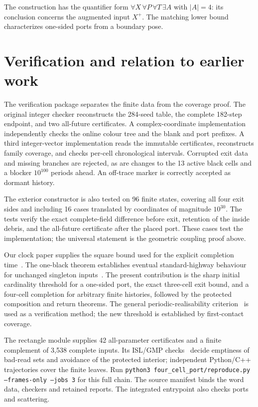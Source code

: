\documentclass[11pt]{article}
\begin{document}
The construction has the quantifier form
$\forall X\,\forall P\,\forall T\,\exists A$ with $|A|=4$: its conclusion
concerns the augmented input $X^+$. The matching lower bound characterizes
one-sided ports from a boundary pose.






\section{Verification and relation to earlier work}
The verification package separates the finite data from the coverage proof.
The original integer checker reconstructs the 284-seed table, the complete
182-step endpoint, and two all-future certificates. A complex-coordinate
implementation independently checks the online colour tree and the blank
and port prefixes. A third integer-vector implementation reads the immutable
certificates, reconstructs family coverage, and checks per-cell chronological
intervals. Corrupted exit data and missing branches are rejected, as are
changes to the 13 active black cells and a blocker $10^{100}$ periods ahead.
An off-trace marker is correctly accepted as dormant history.

The exterior constructor is also tested on 96 finite states, covering all
four exit sides and including 16 cases translated by coordinates of magnitude
$10^{30}$. The tests verify the exact complete-field difference before exit,
retention of the inside debris, and the all-future certificate after the
placed port. These cases test the implementation; the universal statement
is the geometric coupling proof above.

Our clock paper supplies the square bound used for the explicit completion
time~\cite{clock2026}. The one-black theorem
establishes eventual standard-highway behaviour for unchanged singleton
inputs~\cite{ke2026}. The present contribution is the sharp initial
cardinality threshold for a one-sided port, the exact three-cell exit bound,
and a four-cell completion for arbitrary finite histories, followed by the
protected composition and return theorems. The general
periodic-realisability criterion~\cite{jillhewar2026} is used as a verification
method; the new threshold is established by first-contact coverage.

The rectangle module supplies 42 all-parameter certificates and a finite
complement of 3,538 complete inputs. Its ISL/GMP checks~\cite{islframes} decide emptiness of
bad-read sets and avoidance of the protected interior; independent Python/C++
trajectories cover the finite leaves. Run
\texttt{python3 four\_cell\_port/reproduce.py --frames-only --jobs 3}
for this full chain. The source manifest binds the word data, checkers and
retained reports. The integrated entrypoint also checks ports and scattering.
\end{document}
